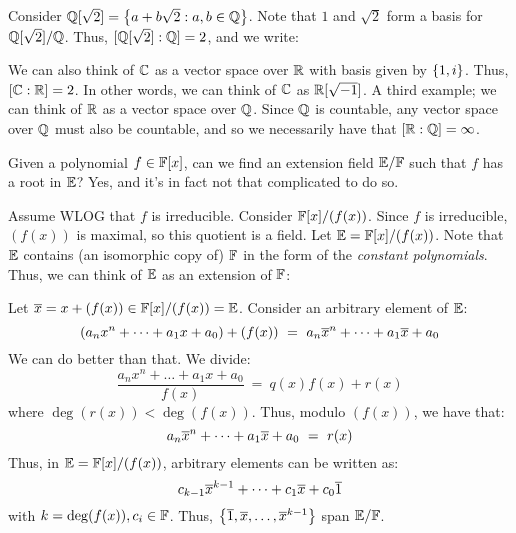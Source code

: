 \begin{xmp}[source=Primary Source Material]
    Consider $ \mathbb{Q}[\sqrt{2}] = \left\{{a+b\sqrt{2} : a,b \in \mathbb{Q}}\right\} $.
    Note that $ 1 $ and $ \sqrt{2} $ form a basis for
    $ \mathbb{Q}[\sqrt{2}]/\mathbb{Q} $.
    Thus, $ [\mathbb{Q}[\sqrt{2}] : \mathbb{Q}] = 2 $, and we write:
    
    \centering
    \flushleft
    
    We can also think of $ \mathbb{C} $ as a vector space over $ \mathbb{R} $ with basis
    given by $ \left\{{1, i}\right\} $. Thus, $ [\mathbb{C}:\mathbb{R}] = 2 $.
    In other words, we can think of $ \mathbb{C} $ as $ \mathbb{R}[\sqrt{-1}] $. \vsp
    A third example; we can think of $ \mathbb{R} $ as a vector space over
    $ \mathbb{Q} $. Since $ \mathbb{Q} $ is countable, any vector space over $ \mathbb{Q} $
    must also be countable, and so we necessarily have that
    $ [\mathbb{R}:\mathbb{Q}] = \infty $.
\end{xmp}

Given a polynomial $ f \in \mathbb{F}[x] $, can we find an extension field
$ \mathbb{E}/\mathbb{F} $ such that $ f $ has a root in $ \mathbb{E} $? Yes, and it's in fact
not that complicated to do so.

Assume WLOG that $ f $ is irreducible. Consider $ \mathbb{F}[x]/(f(x)) $. Since
$ f $ is irreducible, $ (f(x)) $ is maximal, so this quotient is a field.
Let $ \mathbb{E} = \mathbb{F}[x]/(f(x)) $. Note that $ \mathbb{E} $ contains (an isomorphic
copy of) $ \mathbb{F} $ in the form of the \textit{constant polynomials}. Thus, we
can think of $ \mathbb{E} $ as an extension of $ \mathbb{F} $:

\centering
{}
\flushleft

Let $ \overline{x} = x + (f(x)) \in \mathbb{F}[x]/(f(x)) = \mathbb{E} $. Consider an
arbitrary element of $ \mathbb{E} $:
\begin{equation*}
    (a_{n}x^{n}+\dots+a_{1}x+a_{0}) + (f(x)) \ = \
    a_{n}\overline{x}^{n}+\dots+a_{1}\overline{x}+a_{0}
\end{equation*}
We can do better than that. We divide:
\begin{equation*}
    \frac{a_{n}x^{n}+\dots+a_{1}x+a_{0}}{f(x)} \ = \ q(x)f(x) + r(x)
\end{equation*}
where $ \deg(r(x)) < \deg(f(x)) $. Thus, modulo $ (f(x)) $, we have that:
\begin{equation*}
    a_{n}\overline{x}^{n}+\dots+a_{1}\overline{x}+a_{0} \ = \ r(x)
\end{equation*}
Thus, in $ \mathbb{E} = \mathbb{F}[x]/(f(x)) $, arbitrary elements can be written as:
\begin{equation*}
    c_{k-1}\overline{x}^{k-1}+\dots+c_{1}\overline{x}+c_{0}\overline{1}
\end{equation*}
with $ k = \deg(f(x)), c_{i} \in \mathbb{F} $. Thus, $ \left\{{\overline{1}, \overline{x},
\dots, \overline{x}^{k-1}}\right\} $ span $ \mathbb{E}/\mathbb{F} $.


